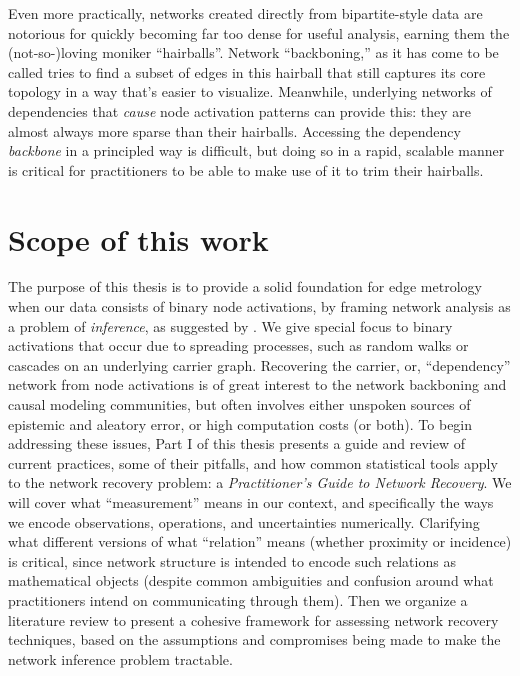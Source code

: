 \documentclass[%
	12pt,
		oneside,
		letterpaper
]{book}
\begin{document}
Even more practically, networks created directly from bipartite-style
data are notorious for quickly becoming far too dense for useful
analysis, earning them the (not-so-)loving moniker ``hairballs''.
Network ``backboning,'' as it has come to be called tries to find a
subset of edges in this hairball that still captures its core topology
in a way that's easier to
visualize.\autocite{twostagealgorithm_Slater2009,backbonebipartiteprojections_Neal2014}
Meanwhile, underlying networks of dependencies that \emph{cause} node
activation patterns can provide this: they are almost always more sparse
than their hairballs. Accessing the dependency \emph{backbone} in a
principled way is difficult, but doing so in a rapid, scalable manner is
critical for practitioners to be able to make use of it to trim their
hairballs.

\section{Scope of this work}\label{scope-of-this-work}

The purpose of this thesis is to provide a solid foundation for edge
metrology when our data consists of binary node activations, by framing
network analysis as a problem of \emph{inference}, as suggested by
\textcite{Statisticalinferencelinks_Peel2022}. We give special focus to
binary activations that occur due to spreading processes, such as random
walks or cascades on an underlying carrier graph. Recovering the
carrier, or, ``dependency'' network from node activations is of great
interest to the network backboning and causal modeling communities, but
often involves either unspoken sources of epistemic and aleatory error,
or high computation costs (or both). To begin addressing these issues,
Part I of this thesis presents a guide and review of current practices,
some of their pitfalls, and how common statistical tools apply to the
network recovery problem: a \emph{Practitioner's Guide to Network
Recovery}. We will cover what ``measurement'' means in our context, and
specifically the ways we encode observations, operations, and
uncertainties numerically. Clarifying what different versions of what
``relation'' means (whether proximity or incidence) is critical, since
network structure is intended to encode such relations as mathematical
objects (despite common ambiguities and confusion around what
practitioners intend on communicating through them). Then we organize a
literature review to present a cohesive framework for assessing network
recovery techniques, based on the assumptions and compromises being made
to make the network inference problem tractable.
\end{document}
